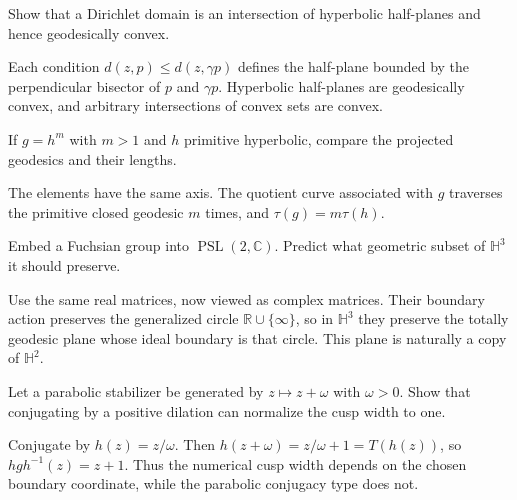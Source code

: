 \begin{problem}\label{prob:vii35-ch02}
Show that a Dirichlet domain is an intersection of hyperbolic half-planes and hence geodesically convex.
\end{problem}

\begin{solution}
Each condition \(d(z,p)\le d(z,\gamma p)\) defines the half-plane bounded by the perpendicular bisector of \(p\) and \(\gamma p\).  Hyperbolic half-planes are geodesically convex, and arbitrary intersections of convex sets are convex.
\end{solution}

\begin{problem}\label{prob:vii35-ch03}
If \(g=h^m\) with \(m>1\) and \(h\) primitive hyperbolic, compare the projected geodesics and their lengths.
\end{problem}

\begin{solution}
The elements have the same axis.  The quotient curve associated with \(g\) traverses the primitive closed geodesic \(m\) times, and \(\tau(g)=m\tau(h)\).
\end{solution}

\begin{problem}\label{prob:vii35-ch04}
Embed a Fuchsian group into \(\operatorname{PSL}(2,\mathbb C)\).  Predict what geometric subset of \(\mathbb H^3\) it should preserve.
\end{problem}

\begin{solution}
Use the same real matrices, now viewed as complex matrices.  Their boundary action preserves the generalized circle \(\mathbb R\cup\{\infty\}\), so in \(\mathbb H^3\) they preserve the totally geodesic plane whose ideal boundary is that circle.  This plane is naturally a copy of \(\mathbb H^2\).
\end{solution}

\begin{problem}\label{prob:vii35-ch05}
Let a parabolic stabilizer be generated by \(z\mapsto z+\omega\) with \(\omega>0\).  Show that conjugating by a positive dilation can normalize the cusp width to one.
\end{problem}

\begin{solution}
Conjugate by \(h(z)=z/\omega\).  Then \(h(z+\omega)=z/\omega+1=T(h(z))\), so \(hgh^{-1}(z)=z+1\).  Thus the numerical cusp width depends on the chosen boundary coordinate, while the parabolic conjugacy type does not.
\end{solution}
